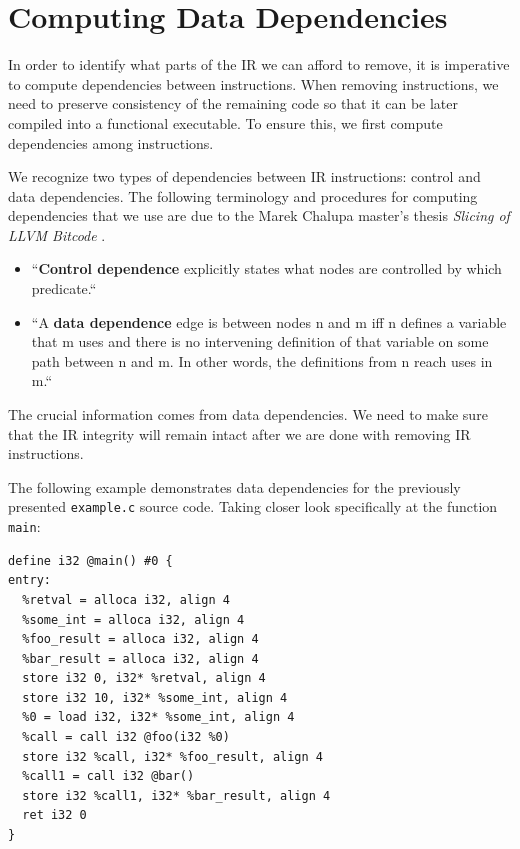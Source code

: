 \documentclass[12pt, twoside]{fithesis2}
\renewcommand{\_}{\leavevmode \kern0.07em\vbox{\hrule width0.4em}}
\newcommand{\squarebullet}{\textcolor{black}{\raisebox{0.15em}{\rule{4pt}{4pt}}}}
\newenvironment{myItemize}{
  \begin{itemize}[
    leftmargin=2em,
    rightmargin=1em,
    itemsep=\parskip,
    parsep=0em,
    topsep=0em,
    partopsep=0em
]
  \renewcommand{\labelitemi}{\squarebullet}
  \renewcommand{\labelitemii}{\textbullet}
}{
  \end{itemize}
}
\begin{document}
\section{Computing Data Dependencies}
\label{sec:design-dep}

In order to identify what parts of the IR we can afford to remove, it is
imperative to compute dependencies between instructions.
When removing instructions, we need to preserve consistency of the remaining
code so that it can be later compiled into a functional executable.
To ensure this, we first compute dependencies among instructions.

We recognize two types of dependencies between IR instructions: control and data
dependencies.
The following terminology and procedures for computing dependencies that we use
are due to the Marek Chalupa master's thesis \textit{Slicing of LLVM Bitcode}
\cite{dg}.

\begin{myItemize}
\item ``\textbf{Control dependence} explicitly states what nodes are
controlled by which predicate.``
\item ``A \textbf{data dependence} edge is between nodes n and
m iff n defines a variable that m uses and there is no intervening definition
of that variable on some path between n and m. In other words, the definitions
from n reach uses in m.``
\end{myItemize}

The crucial information comes from data dependencies. We need to make sure that
the IR integrity will remain intact after we are done with removing IR
instructions.

The following example demonstrates data dependencies for the
previously presented \texttt{example.c} source code.
Taking closer look specifically at the function \texttt{main}:

\begin{verbatim}
define i32 @main() #0 {
entry:
  %retval = alloca i32, align 4
  %some_int = alloca i32, align 4
  %foo_result = alloca i32, align 4
  %bar_result = alloca i32, align 4
  store i32 0, i32* %retval, align 4
  store i32 10, i32* %some_int, align 4
  %0 = load i32, i32* %some_int, align 4
  %call = call i32 @foo(i32 %0)
  store i32 %call, i32* %foo_result, align 4
  %call1 = call i32 @bar()
  store i32 %call1, i32* %bar_result, align 4
  ret i32 0
}
\end{verbatim}
\end{document}
